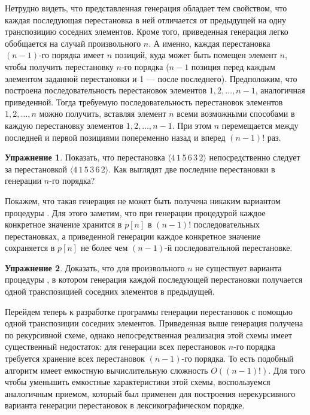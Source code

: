 \documentclass[12pt,a4paper]{article}
\theoremstyle{plain}
\theoremstyle{definition}
\newtheorem*{task}{Упражнение}
\theoremstyle{remark}
\begin{document}
Нетрудно видеть, что представленная генерация обладает тем свойством, что каждая последующая перестановка в ней отличается от предыдущей на одну транспозицию соседних элементов. Кроме того, приведенная генерация легко обобщается на случай произвольного $n$. А именно, каждая перестановка $(n-1)$-го порядка имеет $n$ позиций, куда может быть помещен элемент $n$, чтобы получить перестановку $n$-го порядка ($n-1$ позиция перед каждым элементом заданной перестановки и 1 --- после последнего). Предположим, что построена последовательность перестановок элементов $1,2,\ldots,n-1$, аналогичная приведенной. Тогда требуемую последовательность перестановок элементов $1,2,\ldots,n$ можно получить, вставляя элемент $n$ всеми возможными способами в каждую перестановку элементов $1,2,\ldots,n-1$. При этом $n$ перемещается между последней и первой позициями попеременно назад и вперед $(n-1)!$ раз.

\begin{task}
Показать, что перестановка $\langle 4\,1\,5\,6\,3\,2 \rangle$ непосредственно следует за перестановкой $\langle 4\,1\,5\,3\,6\,2 \rangle$. Как выглядят две последние перестановки в генерации $n$-го порядка?
\end{task}

Покажем, что такая генерация не может быть получена никаким вариантом процедуры \verb@perm@. Для этого заметим, что при генерации процедурой \verb@perm@ каждое конкретное значение хранится в $p[n]$ в $(n-1)!$ последовательных перестановках, а приведенной генерации каждое конкретное значение сохраняется в $p[n]$ не более чем $(n-1)$-й последовательной перестановке.

\begin{task}
Доказать, что для произвольного $n$ не существует варианта процедуры \verb@perm@, в котором генерация каждой последующей перестановки получается одной транспозицией соседних элементов в предыдущей.
\end{task}

Перейдем теперь к разработке программы генерации перестановок с помощью одной транспозиции соседних элементов. Приведенная выше генерация получена по рекурсивной схеме, однако непосредственная реализация этой схемы имеет существенный недостаток: для генерации всех перестановок $n$-го порядка требуется хранение всех перестановок $(n-1)$-го порядка. То есть подобный алгоритм имеет емкостную вычислительную сложность $O((n-1)!)$. Для того чтобы уменьшить емкостные характеристики этой схемы, воспользуемся аналогичным приемом, который был применен для построения нерекурсивного варианта генерации перестановок в лексикографическом порядке.
\end{document}
